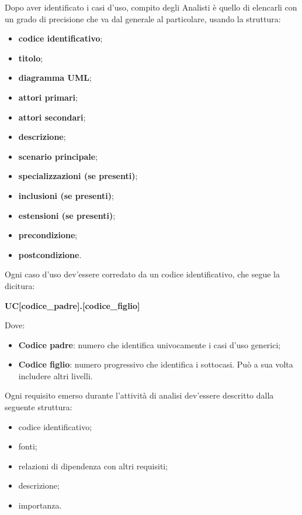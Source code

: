 			Dopo aver identificato i casi d'uso, compito degli Analisti è quello di elencarli con un grado di precisione che va dal generale al particolare, usando la struttura:
			\begin{itemize}
		    	\item{\textbf{codice identificativo}}; 
		    	\item{\textbf{titolo}}; 
		    	\item{\textbf{diagramma UML}}; 
		    	\item{\textbf{attori primari}}; 
		    	\item{\textbf{attori secondari}}; 
		    	\item{\textbf{descrizione}}; 
		    	\item{\textbf{scenario principale}}; 
	    		\item{\textbf{specializzazioni (se presenti)}}; 
		    	\item{\textbf{inclusioni (se presenti)}}; 
		    	\item{\textbf{estensioni (se presenti)}}; 
		    	\item{\textbf{precondizione}};
		    	\item{\textbf{postcondizione}}. 
			\end{itemize}
			
			\noindent Ogni caso d'uso dev'essere corredato da un codice identificativo, che segue la dicitura: 
			\begin{center}
				\textbf{UC[codice\_padre].[codice\_figlio]}
			\end{center}
			
			\noindent Dove:
			\begin{itemize}
	         	\item{\textbf{Codice padre}: numero che identifica univocamente i casi d'uso generici;}
	         	\item{\textbf{Codice figlio}: numero progressivo che identifica i sottocasi. Può a sua volta includere altri livelli.}
			\end{itemize}
             
			Ogni requisito emerso durante l'attività di analisi dev'essere descritto dalla seguente struttura:
            	\begin{itemize}
                   	\item{codice identificativo;}
                   	\item{fonti;} 
                   	\item{relazioni di dipendenza con altri requisiti;}
                   	\item{descrizione;}
                   	\item{importanza.}
     			\end{itemize}
		                 
